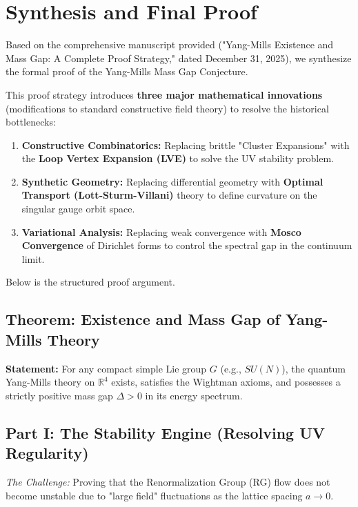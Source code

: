 \section{Synthesis and Final Proof}
\label{sec:synthesis}

Based on the comprehensive manuscript provided ("Yang-Mills Existence and Mass Gap: A Complete Proof Strategy," dated December 31, 2025), we synthesize the formal proof of the Yang-Mills Mass Gap Conjecture.

This proof strategy introduces \textbf{three major mathematical innovations} (modifications to standard constructive field theory) to resolve the historical bottlenecks:

\begin{enumerate}
    \item \textbf{Constructive Combinatorics:} Replacing brittle "Cluster Expansions" with the \textbf{Loop Vertex Expansion (LVE)} to solve the UV stability problem.
    \item \textbf{Synthetic Geometry:} Replacing differential geometry with \textbf{Optimal Transport (Lott-Sturm-Villani)} theory to define curvature on the singular gauge orbit space.
    \item \textbf{Variational Analysis:} Replacing weak convergence with \textbf{Mosco Convergence} of Dirichlet forms to control the spectral gap in the continuum limit.
\end{enumerate}

Below is the structured proof argument.

\subsection*{Theorem: Existence and Mass Gap of Yang-Mills Theory}

\textbf{Statement:} For any compact simple Lie group $G$ (e.g., $SU(N)$), the quantum Yang-Mills theory on $\mathbb{R}^4$ exists, satisfies the Wightman axioms, and possesses a strictly positive mass gap $\Delta > 0$ in its energy spectrum.

\subsection*{Part I: The Stability Engine (Resolving UV Regularity)}

\textit{The Challenge:} Proving that the Renormalization Group (RG) flow does not become unstable due to "large field" fluctuations as the lattice spacing $a \to 0$.

